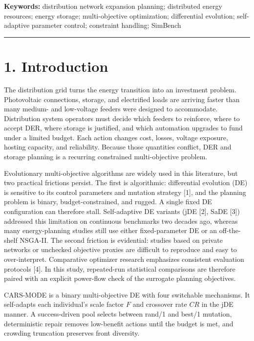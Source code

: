\documentclass[
  10pt,
  a4paper,
]{article}
\begin{document}
\textbf{Keywords:} distribution network expansion planning; distributed
energy resources; energy storage; multi-objective optimization;
differential evolution; self-adaptive parameter control; constraint
handling; SimBench

\begin{center}\rule{0.5\linewidth}{0.5pt}\end{center}

\section{1. Introduction}\label{introduction}

The distribution grid turns the energy transition into an investment
problem. Photovoltaic connections, storage, and electrified loads are
arriving faster than many medium- and low-voltage feeders were designed
to accommodate. Distribution system operators must decide which feeders
to reinforce, where to accept DER, where storage is justified, and which
automation upgrades to fund under a limited budget. Each action changes
cost, losses, voltage exposure, hosting capacity, and reliability.
Because those quantities conflict, DER and storage planning is a
recurring constrained multi-objective problem.

Evolutionary multi-objective algorithms are widely used in this
literature, but two practical frictions persist. The first is
algorithmic: differential evolution (DE) is sensitive to its control
parameters and mutation strategy {[}1{]}, and the planning problem is
binary, budget-constrained, and rugged. A single fixed DE configuration
can therefore stall. Self-adaptive DE variants (jDE {[}2{]}, SaDE
{[}3{]}) addressed this limitation on continuous benchmarks two decades
ago, whereas many energy-planning studies still use either
fixed-parameter DE or an off-the-shelf NSGA-II. The second friction is
evidential: studies based on private networks or unchecked objective
proxies are difficult to reproduce and easy to over-interpret.
Comparative optimizer research emphasizes consistent evaluation
protocols {[}4{]}. In this study, repeated-run statistical comparisons
are therefore paired with an explicit power-flow check of the surrogate
planning objectives.

CARS-MODE is a binary multi-objective DE with four switchable
mechanisms. It self-adapts each individual's scale factor \(F\) and
crossover rate \(CR\) in the jDE manner. A success-driven pool selects
between rand/1 and best/1 mutation, deterministic repair removes
low-benefit actions until the budget is met, and crowding truncation
preserves front diversity.
\end{document}
